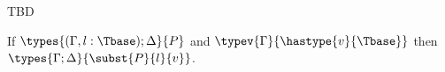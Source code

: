 \begin{lemma}[Strengthening]\mbox{}
  TBD
\end{lemma}

\begin{lemma}[Substitution]\mbox{}
  If $\types{(\Gamma, l : \Tbase);\Delta}{P}$ and ${\typev{\Gamma}{\hastype{v}{\Tbase}}}$ then
  \( \types{\Gamma;\Delta}{\subst{P}{l}{v}} \).
\end{lemma}



